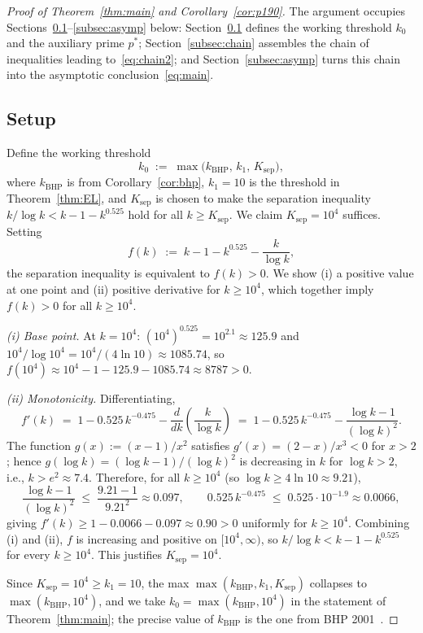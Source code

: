 \documentclass[11pt,reqno,a4paper]{amsart}
\theoremstyle{plain}
\theoremstyle{definition}
\theoremstyle{remark}
\numberwithin{equation}{section}
\begin{document}
\begin{proof}[Proof of Theorem~\ref{thm:main} and Corollary~\ref{cor:p190}]
The argument occupies Sections~\ref{subsec:setup}--\ref{subsec:asymp}
below: Section~\ref{subsec:setup} defines the working threshold $k_0$
and the auxiliary prime $p^{*}$;
Section~\ref{subsec:chain} assembles the chain of inequalities leading
to~\eqref{eq:chain2}; and Section~\ref{subsec:asymp} turns this chain
into the asymptotic conclusion~\eqref{eq:main}.

\subsection{Setup}
\label{subsec:setup}

Define the working threshold
\[
k_{0}\;:=\;\max\bigl(k_{\mathrm{BHP}},\,k_{1},\,K_{\mathrm{sep}}\bigr),
\]
where $k_{\mathrm{BHP}}$ is from Corollary~\ref{cor:bhp}, $k_{1}=10$
is the threshold in Theorem~\ref{thm:EL}, and $K_{\mathrm{sep}}$ is
chosen to make the separation inequality $k/\log k<k-1-k^{0.525}$
hold for all $k\ge K_{\mathrm{sep}}$. We claim
$K_{\mathrm{sep}}=10^{4}$ suffices. Setting
\[
f(k)\;:=\;k-1-k^{0.525}-\frac{k}{\log k},
\]
the separation inequality is equivalent to $f(k)>0$. We show (i) a
positive value at one point and (ii) positive derivative for
$k\ge 10^{4}$, which together imply $f(k)>0$ for all $k\ge 10^{4}$.

\emph{(i) Base point.} At $k=10^{4}$: $(10^{4})^{0.525}=10^{2.1}\approx 125.9$
and $10^{4}/\log 10^{4}=10^{4}/(4\ln 10)\approx 1085.74$, so
$f(10^{4})\approx 10^{4}-1-125.9-1085.74\approx 8787>0$.

\emph{(ii) Monotonicity.} Differentiating,
\[
f'(k)\;=\;1-0.525\,k^{-0.475}-\frac{d}{dk}\!\left(\frac{k}{\log k}\right)
\;=\;1-0.525\,k^{-0.475}-\frac{\log k-1}{(\log k)^{2}}.
\]
The function $g(x):=(x-1)/x^{2}$ satisfies
$g'(x)=(2-x)/x^{3}<0$ for $x>2$; hence
$g(\log k)=(\log k-1)/(\log k)^{2}$ is decreasing in $k$ for
$\log k>2$, i.e., $k>e^{2}\approx 7.4$. Therefore, for all
$k\ge 10^{4}$ (so $\log k\ge 4\ln 10\approx 9.21$),
\[
\frac{\log k-1}{(\log k)^{2}}\;\le\;\frac{9.21-1}{9.21^{2}}\approx 0.097,
\qquad
0.525\,k^{-0.475}\;\le\;0.525\cdot 10^{-1.9}\approx 0.0066,
\]
giving $f'(k)\ge 1-0.0066-0.097\approx 0.90>0$ uniformly for
$k\ge 10^{4}$. Combining (i) and (ii), $f$ is increasing and positive
on $[10^{4},\infty)$, so $k/\log k<k-1-k^{0.525}$ for every
$k\ge 10^{4}$. This justifies $K_{\mathrm{sep}}=10^{4}$.

Since $K_{\mathrm{sep}}=10^{4}\ge k_{1}=10$, the max
$\max(k_{\mathrm{BHP}},k_{1},K_{\mathrm{sep}})$ collapses to
$\max(k_{\mathrm{BHP}},10^{4})$, and we take
$k_{0}=\max(k_{\mathrm{BHP}},10^{4})$ in the statement of
Theorem~\ref{thm:main}; the precise value of $k_{\mathrm{BHP}}$ is
the one from BHP 2001~\cite{BHP}.


\end{proof}
\end{document}
